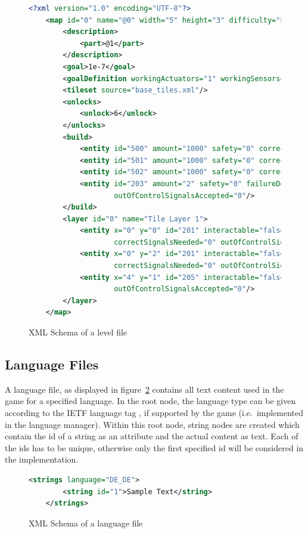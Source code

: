 \begin{figure}
\begin{lstlisting}[language=XML,label={lst:level-xml}]
    <?xml version="1.0" encoding="UTF-8"?>
    <map id="0" name="@0" width="5" height="3" difficulty="EASY">
        <description>
            <part>@1</part>
        </description>
        <goal>1e-7</goal>
        <goalDefinition workingActuators="1" workingSensors="0" workingComputers="0"/>
        <tileset source="base_tiles.xml"/>
        <unlocks>
            <unlock>6</unlock>
        </unlocks>
        <build>
            <entity id="500" amount="1000" safety="0" correctSignalsNeeded="1" outOfControlSignalsAccepted="0"/>
            <entity id="501" amount="1000" safety="0" correctSignalsNeeded="1" outOfControlSignalsAccepted="0"/>
            <entity id="502" amount="1000" safety="0" correctSignalsNeeded="1" outOfControlSignalsAccepted="0"/>
            <entity id="203" amount="2" safety="0" failureDetectionRatio="1" correctSignalsNeeded="1"
                    outOfControlSignalsAccepted="0"/>
        </build>
        <layer id="0" name="Tile Layer 1">
            <entity x="0" y="0" id="201" interactable="false" safety="1e-4" failureDetectionRatio="1"
                    correctSignalsNeeded="0" outOfControlSignalsAccepted="0"/>
            <entity x="0" y="2" id="201" interactable="false" safety="1e-4" failureDetectionRatio="1"
                    correctSignalsNeeded="0" outOfControlSignalsAccepted="0"/>
            <entity x="4" y="1" id="205" interactable="false" safety="0" failureDetectionRatio="1" correctSignalsNeeded="2"
                    outOfControlSignalsAccepted="0"/>
        </layer>
    </map>
\end{lstlisting}
    \caption{XML Schema of a level file}
    \label{fig:xml-level}
\end{figure}
\subsection{Language Files}\label{subsec:language-files}
A language file, as displayed in figure~\ref{fig:xml-lang} contains all text content used in the game for a specified language.
In the root node, the language type can be given according to the \gls{IETF} language tag , if supported by the game (i.e.\ implemented in the language manager).
Within this root node, string nodes are created which contain the id of a string as an attribute and the actual content as text.
Each of the ids has to be unique, otherwise only the first specified id will be considered in the implementation.
\\
\begin{figure}
\begin{lstlisting}[language=XML,label={lst:lang-xml}]
    <strings language="DE_DE">
        <string id="1">Sample Text</string>
    </strings>
\end{lstlisting}
    \caption{XML Schema of a language file}
    \label{fig:xml-lang}
\end{figure}

